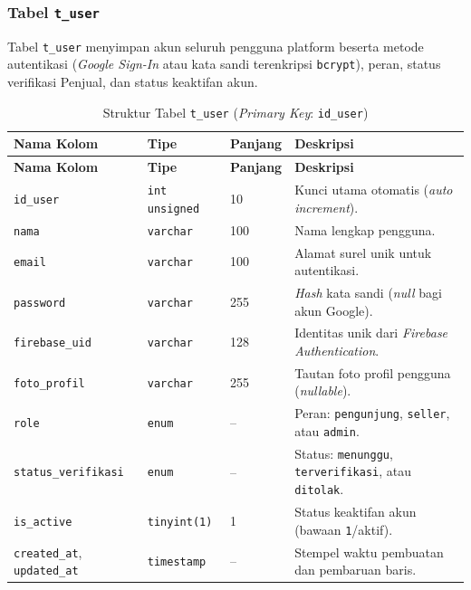 \subsubsection{Tabel \texttt{t\_user}}
Tabel \texttt{t\_user} menyimpan akun seluruh pengguna platform beserta metode autentikasi (\textit{Google Sign-In} atau kata sandi terenkripsi \texttt{bcrypt}), peran, status verifikasi Penjual, dan status keaktifan akun.

\renewcommand{\arraystretch}{1.20}
\begin{longtable}{|L{3.85cm}|L{2.4cm}|C{1.65cm}|L{\dimexpr\textwidth-3.85cm-2.4cm-1.65cm-8\arrayrulewidth\relax}|}
\caption{Struktur Tabel \texttt{t\_user} (\textit{Primary Key}: \texttt{id\_user})}
\label{tab:skema-user} \\
\hline
{}
\textbf{Nama Kolom} & \textbf{Tipe} & \textbf{Panjang} & \textbf{Deskripsi} \\
\hline
\endfirsthead
\hline
{}
\textbf{Nama Kolom} & \textbf{Tipe} & \textbf{Panjang} & \textbf{Deskripsi} \\
\hline
\endhead
\hline
\endfoot
\texttt{id\_user} & \texttt{int unsigned} & 10 & Kunci utama otomatis (\textit{auto increment}). \\
\hline
\texttt{nama} & \texttt{varchar} & 100 & Nama lengkap pengguna. \\
\hline
\texttt{email} & \texttt{varchar} & 100 & Alamat surel unik untuk autentikasi. \\
\hline
\texttt{password} & \texttt{varchar} & 255 & \textit{Hash} kata sandi (\textit{null} bagi akun Google). \\
\hline
\texttt{firebase\_uid} & \texttt{varchar} & 128 & Identitas unik dari \textit{Firebase Authentication}. \\
\hline
\texttt{foto\_profil} & \texttt{varchar} & 255 & Tautan foto profil pengguna (\textit{nullable}). \\
\hline
\texttt{role} & \texttt{enum} & -- & Peran: \texttt{pengunjung}, \texttt{seller}, atau \texttt{admin}. \\
\hline
\texttt{status\_verifikasi} & \texttt{enum} & -- & Status: \texttt{menunggu}, \texttt{terverifikasi}, atau \texttt{ditolak}. \\
\hline
\texttt{is\_active} & \texttt{tinyint(1)} & 1 & Status keaktifan akun (bawaan \texttt{1}/aktif). \\
\hline
\texttt{created\_at}, \texttt{updated\_at} & \texttt{timestamp} & -- & Stempel waktu pembuatan dan pembaruan baris. \\
\hline
\end{longtable}

